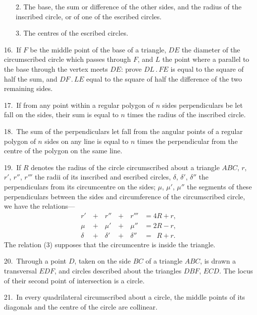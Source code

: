 \documentclass[oneside]{book}
\begin{document}
\begin{footnotesize}
\begin{changemargin}{0.3in}{0in}
\begin{enumerate}
\item[2.] The base, the sum or difference of the other sides, and
the radius of the inscribed circle, or of one of the
escribed circles.

\item[3.] The centres of the escribed circles.
\end{enumerate}
\end{changemargin}

16.~If $F$ be the middle point of the base of a triangle, $DE$ the
diameter of the circumscribed circle which passes through $F$, and
$L$ the point where a parallel to the base through the vertex meets
$DE$: prove $DL\,.\,FE$ is equal to the square of half the sum, and
$DF\,.\,LE$ equal to the square of half the difference of the two remaining
sides.

17.~If from any point within a regular polygon of $n$ sides perpendiculars
be let fall on the sides, their sum is equal to $n$ times
the radius of the inscribed circle.

18.~The sum of the perpendiculars let fall from the angular
points of a regular polygon of $n$ sides on any line is equal to
$n$ times the perpendicular from the centre of the polygon on the
same line.

19.~If $R$ denotes the radius of the circle circumscribed about a
triangle $ABC$, $r$, $r'$, $r''$, $r'''$ the radii of its inscribed and escribed
circles, $\delta$, $\delta'$, $\delta''$ the perpendiculars from its circumcentre on the
sides; $\mu$, $\mu'$, $\mu''$ the segments of these perpendiculars between the
sides and circumference of the circumscribed circle, we have the
relations---
\begin{alignat}{3}
 r' &\,+\, &r'' &\,+\, &r''' &= 4R + r,  \\
 \mu &\,+\, &\mu' &\,+\, &\mu'' &= 2R - r,  \\
 \delta &\,+\, &\delta' &\,+\, &\delta'' &= \phantom{0}R + r.
\end{alignat}
The relation (3) supposes that the circumcentre is inside the
triangle.

20.~Through a point $D$, taken on the side $BC$ of a triangle
$ABC$, is drawn a transversal $EDF$, and circles described about
the triangles $DBF$, $ECD$. The locus of their second point of
intersection is a circle.

21.~In every quadrilateral circumscribed about a circle, the
middle points of its diagonals and the centre of the circle are
collinear.


\end{footnotesize}
\end{document}
